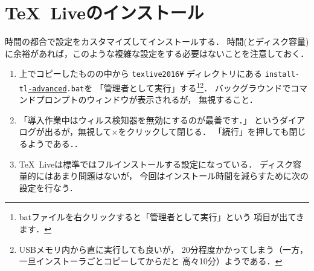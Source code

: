 \documentclass{ltjsarticle}
\begin{document}
\section{\TeX~Liveのインストール}
時間の都合で設定をカスタマイズしてインストールする．
時間(とディスク容量)に余裕があれば，このような複雑な設定をする必要はないことを注意しておく．
\begin{enumerate}
  \itemsep\medskipamount


\item 上でコピーしたものの中から \texttt{texlive2016¥} ディレクトリにある
  \texttt{install-tl\underline{-advanced}.bat}を
  「管理者として実行」する\footnote{%
    batファイルを右クリックすると「管理者として実行」という
    項目が出てきます．
  }\footnote{%
    USBメモリ内から直に実行しても良いが，
    20分程度かかってしまう（一方，一旦インストーラごとコピーしてからだと
    高々10分）ようである．
  }．
  \smallskip
  バックグラウンドでコマンドプロンプトのウィンドウが表示されるが，
  無視すること．

\item 「導入作業中はウィルス検知器を無効にするのが最善です．」
  というダイアログが出るが，無視して×をクリックして閉じる．
  「続行」を押しても閉じるようである．．

\item \TeX~Liveは標準ではフルインストールする設定になっている．
  ディスク容量的にはあまり問題はないが，
  今回はインストール時間を減らすために次の設定を行なう．


\end{enumerate}
\end{document}
